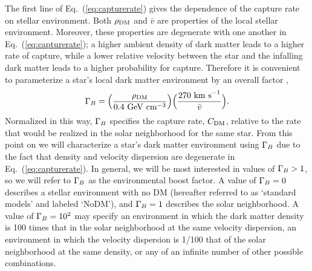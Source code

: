 \documentclass[useAMS,usenatbib]{mnras}
\begin{document}
  The first line of Eq.~(\ref{eq:capturerate}) gives the dependence of the capture rate on stellar environment.
  Both $\rho_{\mathrm{DM}}$ and $\bar{v}$ are properties of the local stellar environment. Moreover,
  these properties are degenerate with one another in Eq.~(\ref{eq:capturerate}); a higher ambient density
  of dark matter leads to a higher rate of capture, while a lower relative velocity between
  the star and the infalling dark matter leads to a higher probability for capture. Therefore it is convenient to parameterize a star's local dark matter
  environment by an overall factor \citep{Zentner2011AsymmetricDwarfs,Hurst2015},
  \begin{equation}
  \Gamma_B = \Big(\frac{\rho_{\mathrm{DM}}}{0.4 \ \mathrm{GeV} \ \mathrm{cm}^{-3}}\Big) \Big(\frac{270 \ \mathrm{km\ s}^{-1}}{\bar{v}}\Big).
  \label{eq:gammab}
  \end{equation}
  Normalized in this way,
  $\Gamma_B$ specifies the capture rate, $C_{\mathrm{DM}}$, relative to
  the rate that would be realized in the solar neighborhood for the same star.
  From this point on we will characterize a star's dark matter environment using
  $\Gamma_B$ due to the fact that density and velocity dispersion are degenerate in
  Eq.~(\ref{eq:capturerate}).
  In general, we will be most interested in values of $\Gamma_B > 1$, so we will refer
  to $\Gamma_B$ as the environmental boost factor.
  A value of $\Gamma_B = 0$ describes a stellar environment with no DM
  (hereafter referred to as `standard models' and labeled `NoDM'),
  and $\Gamma_B = 1$ describes the solar neighborhood.
  A value of $\Gamma_B = 10^{2}$ may specify an environment in
  which the dark matter density is 100 times that in the
  solar neighborhood at the same velocity dispersion,
  an environment in which the velocity dispersion is 1/100
  that of the solar neighborhood at the same density,
  or any of an infinite number of other possible combinations.
\end{document}
